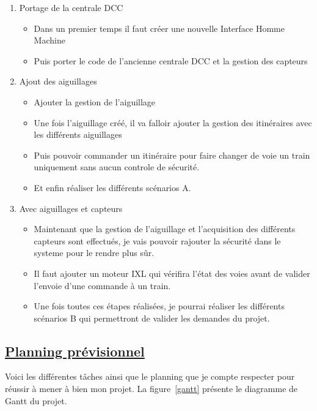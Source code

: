 \begin{enumerate}[1]
  \item Portage de la centrale DCC
  \begin{itemize}
    \item Dans un premier temps il faut cr\'eer une nouvelle Interface
      Homme Machine
    \item Puis porter le code de l'ancienne centrale DCC et la
      gestion des capteurs
  \end{itemize}

  \item Ajout des aiguillages
  \begin{itemize}
    \item Ajouter la gestion de l'aiguillage
    \item Une fois l'aiguillage cr\'e\'e, il va falloir ajouter la
      gestion des itinéraires avec les différents aiguillages
    \item Puis pouvoir commander un itinéraire
      pour faire changer de voie un train uniquement
      sans aucun controle de s\'ecurit\'e.
    \item Et enfin r\'ealiser les diff\'erents sc\'enarios A.
  \end{itemize}

  
  \item Avec aiguillages et capteurs
    \begin{itemize} 
      \item Maintenant que la gestion de l'aiguillage et
        l'acquisition des différents capteurs sont effectués, je vais pouvoir rajouter
        la s\'ecurit\'e dans le systeme pour le rendre plus s\^ur.
      \item Il faut ajouter un moteur IXL\cite{IXL} qui v\'erifira
        l'\'etat des voies avant de valider l'envoie d'une commande \`a
        un train.
      \item Une fois toutes ces étapes réalisées, je pourrai r\'ealiser les
        diff\'erents sc\'enarios B qui permettront de valider les
        demandes du projet.      
    \end{itemize}
\end{enumerate}



\subsection{\underline{Planning pr\'evisionnel}}
\label{sec:planning}

Voici les différentes t\^aches ainsi que le planning que je compte
respecter pour r\'eussir \`a mener \`a bien mon projet. La
figure~\ref{gantt} pr\'esente le diagramme de Gantt du projet.

